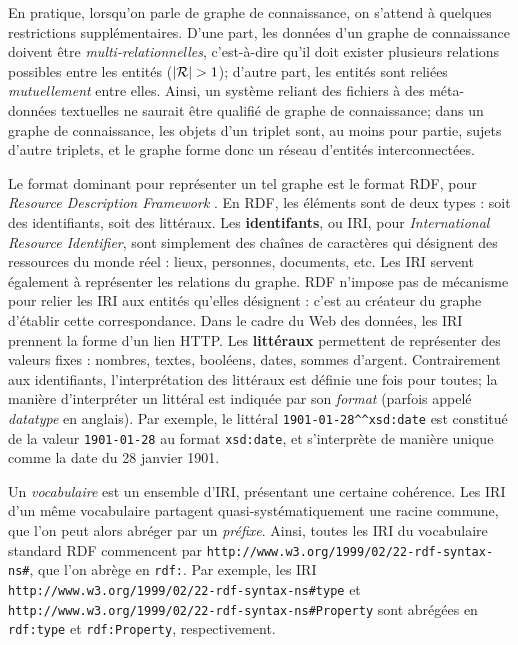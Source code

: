 En pratique, lorsqu'on parle de graphe de connaissance, on s'attend à quelques restrictions supplémentaires. D'une part, les données d'un graphe de connaissance doivent être \textit{multi-relationnelles}, c'est-à-dire qu'il doit exister plusieurs relations possibles entre les entités ($| \mathcal{R} | > 1$); d'autre part, les entités sont reliées \textit{mutuellement} entre elles. Ainsi, un système reliant des fichiers à des méta-données textuelles ne saurait être qualifié de graphe de connaissance; dans un graphe de connaissance, les objets d'un triplet sont, au moins pour partie, sujets d'autre triplets, et le graphe forme donc un réseau d'entités interconnectées. 


Le format dominant pour représenter un tel graphe est le format RDF, pour \textit{Resource Description Framework} \cite{cyganiak14}. En RDF, les éléments sont de deux types : soit des identifiants, soit des littéraux. Les \textbf{identifants}, ou IRI, pour \textit{International Resource Identifier}, sont simplement des chaînes de caractères qui désignent des ressources du monde réel : lieux, personnes, documents, etc. Les IRI servent également à représenter les relations du graphe.
RDF n'impose pas de mécanisme pour relier les IRI aux entités qu'elles désignent : c'est au créateur du graphe d'établir cette correspondance. Dans le cadre du Web des données, les IRI prennent la forme d'un lien HTTP.
Les \textbf{littéraux} permettent de représenter des valeurs fixes : nombres, textes, booléens, dates, sommes d'argent. Contrairement aux identifiants, l'interprétation des littéraux est définie une fois pour toutes; la manière d'interpréter un littéral est indiquée par son \textit{format} (parfois appelé \textit{datatype} en anglais). Par exemple, le littéral \texttt{1901-01-28\^{}\^{}xsd:date} est constitué de la valeur \texttt{1901-01-28} au format \texttt{xsd:date}, et s'interprète de manière unique comme la date du 28 janvier 1901.

Un \textit{vocabulaire} est un ensemble d'IRI, présentant une certaine cohérence. Les IRI d'un même vocabulaire partagent quasi-systématiquement une racine commune, que l'on peut alors abréger par un \textit{préfixe}. Ainsi, toutes les IRI du vocabulaire standard RDF commencent par \texttt{http://www.w3.org/1999/02/22-rdf-syntax-ns\#}, que l'on abrège en \texttt{rdf:}. Par exemple, les IRI \texttt{http://www.w3.org/1999/02/22-rdf-syntax-ns\#type} et \texttt{http://www.w3.org/1999/02/22-rdf-syntax-ns\#Property} sont abrégées en \texttt{rdf:type} et \texttt{rdf:Property}, respectivement. 


